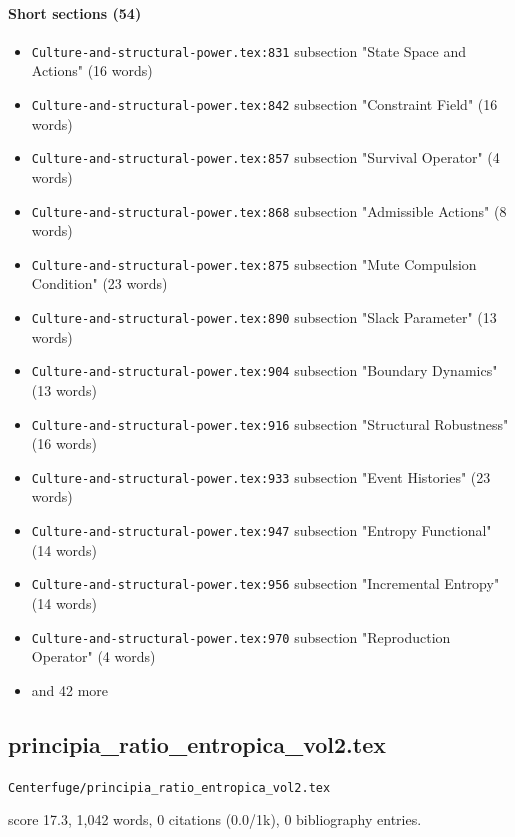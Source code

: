 \documentclass[11pt]{article}
\newcommand{\loc}[1]{{\small\color{muted}\texttt{#1}}}
\begin{document}
\paragraph{Short sections (54)}
\begin{itemize}
\item \loc{Culture-and-structural-power.tex:831} subsection "State Space and Actions" (16 words)
\item \loc{Culture-and-structural-power.tex:842} subsection "Constraint Field" (16 words)
\item \loc{Culture-and-structural-power.tex:857} subsection "Survival Operator" (4 words)
\item \loc{Culture-and-structural-power.tex:868} subsection "Admissible Actions" (8 words)
\item \loc{Culture-and-structural-power.tex:875} subsection "Mute Compulsion Condition" (23 words)
\item \loc{Culture-and-structural-power.tex:890} subsection "Slack Parameter" (13 words)
\item \loc{Culture-and-structural-power.tex:904} subsection "Boundary Dynamics" (13 words)
\item \loc{Culture-and-structural-power.tex:916} subsection "Structural Robustness" (16 words)
\item \loc{Culture-and-structural-power.tex:933} subsection "Event Histories" (23 words)
\item \loc{Culture-and-structural-power.tex:947} subsection "Entropy Functional" (14 words)
\item \loc{Culture-and-structural-power.tex:956} subsection "Incremental Entropy" (14 words)
\item \loc{Culture-and-structural-power.tex:970} subsection "Reproduction Operator" (4 words)
\item[] {\color{muted}\small and 42 more}
\end{itemize}
\subsection{principia\_ratio\_entropica\_vol2.tex}
\loc{Centerfuge/\allowbreak{}principia\_ratio\_entropica\_vol2.tex}\par
score 17.3, 1,042 words, 0 citations (0.0/1k), 0 bibliography entries.
\end{document}
